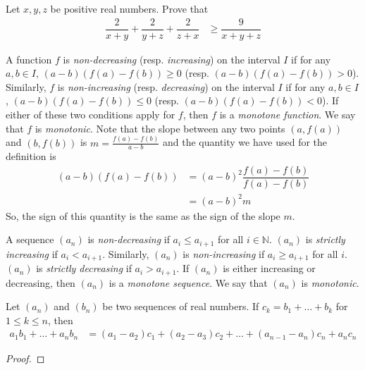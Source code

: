 \documentclass{subfile}
\begin{document}
		\begin{problem}
			Let $x,y,z$ be positive real numbers. Prove that
				\begin{align*}
					\dfrac{2}{x+y}+\dfrac{2}{y+z}+\dfrac{2}{z+x}
						& \geq \dfrac{9}{x+y+z}
				\end{align*}
			
				\begin{solution}
					
				\end{solution}
		\end{problem}
	A function $f$ is \textit{non-decreasing} (resp. \textit{increasing}) on the interval $I$ if for any $a,b\in I$, $(a-b)(f(a)-f(b))\geq0$ (resp. $(a-b)(f(a)-f(b))>0$). Similarly, $f$ is \textit{non-increasing} (resp. \textit{decreasing}) on the interval $I$ if for any $a,b\in I$, $(a-b)(f(a)-f(b))\leq0$ (resp. $(a-b)(f(a)-f(b))<0$). If either of these two conditions apply for $f$, then $f$ is a \textit{monotone function}. We say that $f$ is \textit{monotonic}.
	Note that the slope between any two points $(a,f(a))$ and $(b,f(b))$ is $m=\frac{f(a)-f(b)}{a-b}$ and the quantity we have used for the definition is
		\begin{align*}
			(a-b)(f(a)-f(b))
				& = (a-b)^2\dfrac{f(a)-f(b)}{f(a)-f(b)}\\
				& = (a-b)^2m
		\end{align*}
	So, the sign of this quantity is the same as the sign of the slope $m$.

	A sequence $(a_n)$ is \textit{non-decreasing} if $a_i\leq a_{i+1}$ for all $i\in\mathbb{N}$. $(a_n)$ is \textit{strictly increasing} if $a_i<a_{i+1}$. Similarly, $(a_n)$ is \textit{non-increasing} if $a_i\geq a_{i+1}$ for all $i$. $(a_n)$ is \textit{strictly decreasing} if $a_i>a_{i+1}$. If $(a_n)$ is either increasing or decreasing, then $(a_n)$ is a \textit{monotone sequence}. We say that $(a_n)$ is \textit{monotonic}.
		\begin{theorem}\label{thm:abelform}
			Let $(a_{n})$ and $(b_{n})$ be two sequences of real numbers. If $c_{k}=b_{1}+\ldots+b_{k}$ for $1\leq k\leq n$, then
				\begin{align*}
					a_{1}b_{1}+\ldots+a_{n}b_{n}
						& = (a_{1}-a_{2})c_{1}+(a_{2}-a_{3})c_{2}+\ldots+(a_{n-1}-a_{n})c_{n}+a_{n}c_{n}
				\end{align*}
			
				\begin{proof}
					
				\end{proof}
		\end{theorem}
	
\end{document}
